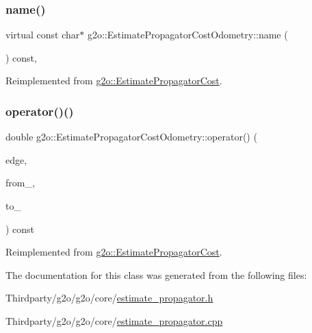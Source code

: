\subsubsection{\texorpdfstring{name()}{name()}}
{\footnotesize\ttfamily virtual const char$\ast$ g2o\+::\+Estimate\+Propagator\+Cost\+Odometry\+::name (\begin{DoxyParamCaption}{ }\end{DoxyParamCaption}) const\hspace{0.3cm}{\ttfamily [inline]}, {\ttfamily [virtual]}}



Reimplemented from \mbox{\hyperlink{classg2o_1_1_estimate_propagator_cost_a49846dd23f5d49df6e1fc5c2ff854fca}{g2o\+::\+Estimate\+Propagator\+Cost}}.

\mbox{\label{classg2o_1_1_estimate_propagator_cost_odometry_a3da1f1d67f717d0dbc0077db1c571146}} 
\subsubsection{\texorpdfstring{operator()()}{operator()()}}
{\footnotesize\ttfamily double g2o\+::\+Estimate\+Propagator\+Cost\+Odometry\+::operator() (\begin{DoxyParamCaption}\item[{\mbox{\hyperlink{classg2o_1_1_optimizable_graph_1_1_edge}{Optimizable\+Graph\+::\+Edge}} $\ast$}]{edge,  }\item[{const \mbox{\hyperlink{classg2o_1_1_hyper_graph_a703938cdb4bb636860eed55a2489d70c}{Optimizable\+Graph\+::\+Vertex\+Set}} \&}]{from\+\_\+,  }\item[{\mbox{\hyperlink{classg2o_1_1_optimizable_graph_1_1_vertex}{Optimizable\+Graph\+::\+Vertex}} $\ast$}]{to\+\_\+ }\end{DoxyParamCaption}) const\hspace{0.3cm}{\ttfamily [virtual]}}



Reimplemented from \mbox{\hyperlink{classg2o_1_1_estimate_propagator_cost_a1234b3b82be9b8448cc62b18625adfa6}{g2o\+::\+Estimate\+Propagator\+Cost}}.



The documentation for this class was generated from the following files\+:\begin{DoxyCompactItemize}
\item 
Thirdparty/g2o/g2o/core/\mbox{\hyperlink{estimate__propagator_8h}{estimate\+\_\+propagator.\+h}}\item 
Thirdparty/g2o/g2o/core/\mbox{\hyperlink{estimate__propagator_8cpp}{estimate\+\_\+propagator.\+cpp}}\end{DoxyCompactItemize}

